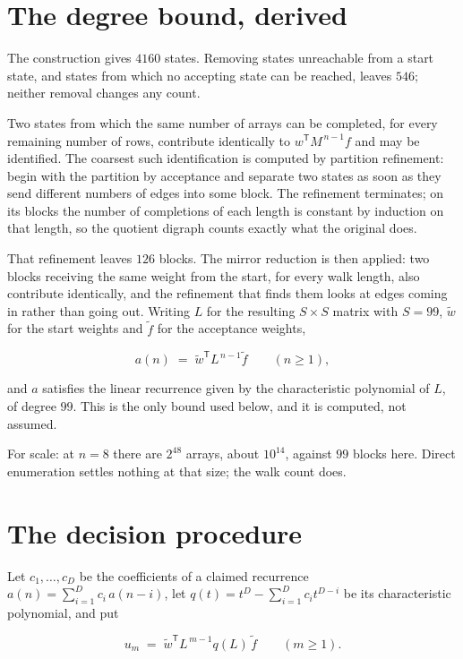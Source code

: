 \documentclass[11pt]{article}
\theoremstyle{definition}
\begin{document}
\section{The degree bound, derived}

The construction gives $4160$ states. Removing states unreachable from a start state, and states from which no accepting state can be reached, leaves $546$; neither removal changes any count.

Two states from which the same number of arrays can be completed, for every remaining number of rows, contribute identically to $w^{\mathsf T}M^{\,n-1}f$ and may be identified. The coarsest such identification is computed by partition refinement: begin with the partition by acceptance and separate two states as soon as they send different numbers of edges into some block. The refinement terminates; on its blocks the number of completions of each length is constant by induction on that length, so the quotient digraph counts exactly what the original does.

That refinement leaves $126$ blocks. The mirror reduction is then applied: two blocks receiving the same weight from the start, for every walk length, also contribute identically, and the refinement that finds them looks at edges coming in rather than going out. Writing $L$ for the resulting $S \times S$ matrix with $S = 99$, $\tilde w$ for the start weights and $\tilde f$ for the acceptance weights,

\[a(n) \;=\; \tilde w^{\mathsf T} L^{\,n-1} \tilde f \qquad (n \ge 1),\]

and $a$ satisfies the linear recurrence given by the characteristic polynomial of $L$, of degree $99$. This is the only bound used below, and it is computed, not assumed.

For scale: at $n = 8$ there are $2^{48}$ arrays, about $10^{14}$, against $99$ blocks here. Direct enumeration settles nothing at that size; the walk count does.

\section{The decision procedure}

Let $c_1,\dots,c_D$ be the coefficients of a claimed recurrence $a(n) = \sum_{i=1}^{D} c_i\,a(n-i)$, let $q(t) = t^{D} - \sum_{i=1}^{D} c_i t^{D-i}$ be its characteristic polynomial, and put

\[u_m \;=\; \tilde w^{\mathsf T} L^{\,m-1} q(L)\,\tilde f \qquad (m \ge 1).\]
\end{document}
